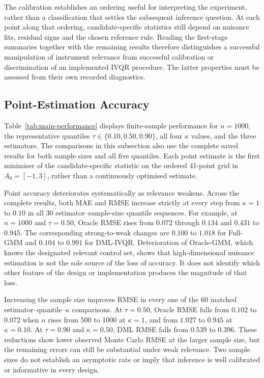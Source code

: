 The calibration establishes an ordering useful for interpreting the experiment, rather than a classification that settles the subsequent inference question. At each point along that ordering, candidate-specific statistics still depend on nuisance fits, residual signs and the chosen reference rule. Reading the first-stage summaries together with the remaining results therefore distinguishes a successful manipulation of instrument relevance from successful calibration or discrimination of an implemented IVQR procedure. The latter properties must be assessed from their own recorded diagnostics.

\subsection{Point-Estimation Accuracy}
\label{sec:results-point-accuracy}

Table~\ref{tab:main-performance} displays finite-sample performance for $n=1000$, the representative quantiles $\tau\in\{0.10,0.50,0.90\}$, all four $\kappa$ values, and the three estimators. The comparisons in this subsection also use the complete saved results for both sample sizes and all five quantiles. Each point estimate is the first minimiser of the candidate-specific statistic on the ordered 41-point grid in $A_0=[-1,3]$, rather than a continuously optimised estimate.



Point accuracy deteriorates systematically as relevance weakens. Across the complete results, both MAE and RMSE increase strictly at every step from $\kappa=1$ to $0.10$ in all 30 estimator--sample-size--quantile sequences. For example, at $n=1000$ and $\tau=0.50$, Oracle RMSE rises from $0.072$ through $0.134$ and $0.431$ to $0.945$. The corresponding strong-to-weak changes are $0.100$ to $1.018$ for Full-GMM and $0.104$ to $0.991$ for DML-IVQR. Deterioration of Oracle-GMM, which knows the designated relevant control set, shows that high-dimensional nuisance estimation is not the sole source of the loss of accuracy. It does not identify which other feature of the design or implementation produces the magnitude of that loss.

Increasing the sample size improves RMSE in every one of the 60 matched estimator--quantile--$\kappa$ comparisons. At $\tau=0.50$, Oracle RMSE falls from $0.102$ to $0.072$ when $n$ rises from 500 to 1000 at $\kappa=1$, and from $1.027$ to $0.945$ at $\kappa=0.10$. At $\tau=0.90$ and $\kappa=0.50$, DML RMSE falls from $0.539$ to $0.396$. These reductions show lower observed Monte Carlo RMSE at the larger sample size, but the remaining errors can still be substantial under weak relevance. Two sample sizes do not establish an asymptotic rate or imply that inference is well calibrated or informative in every design.

